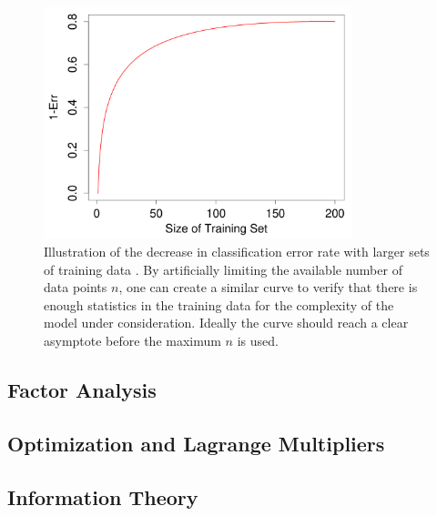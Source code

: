 \begin{figure}
\centering
\includegraphics[width=0.8\textwidth]{figures/ml/acc_vs_n.png}
\caption{
Illustration of the decrease in classification error rate
with larger sets of training data \cite{HastieTF09}.
By artificially limiting the available number of data points $n$,
one can create a similar curve to verify that
there is enough statistics in the training data
for the complexity of the model under consideration.
Ideally the curve should reach a clear asymptote before the maximum $n$ is used.
}
\label{fig:additional:misc:enough_data}
\end{figure}

\subsection{Factor Analysis}
\label{additional:misc:factor_ana}

\subsection{Optimization and Lagrange Multipliers}
\label{additional:misc:opt}

\subsection{Information Theory}
\label{additional:misc:info_theory}

